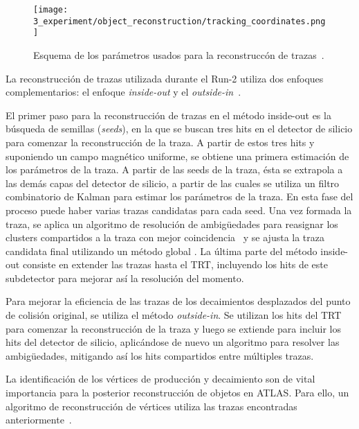 \begin{figure}[ht!]
    \centering
    \texttt{[image: 3\_experiment/object\_reconstruction/tracking\_coordinates.png]}
    \caption{Esquema de los par\'ametros usados para la reconstrucc\'on de trazas~\cite{ATLAS-Tracking-2007}.}
    \label{fig:objects:track_vtx:track_parameters}
\end{figure}

La reconstrucción de trazas utilizada durante el Run-2 utiliza dos enfoques complementarios: el enfoque \textit{inside-out} y el \textit{outside-in}~\cite{ATLAS-NEWT}.

El primer paso para la reconstrucción de trazas en el m\'etodo inside-out es la búsqueda de semillas (\textit{seeds}), en la que se buscan tres hits en el detector de silicio para comenzar la reconstrucción de la traza. A partir de estos tres hits y suponiendo un campo magnético uniforme, se obtiene una primera estimación de los parámetros de la traza. A partir de las seeds de la traza, ésta se extrapola a las demás capas del detector de silicio, a partir de las cuales se utiliza un filtro combinatorio de Kalman para estimar los parámetros de la traza. En esta fase del proceso puede haber varias trazas candidatas para cada seed. Una vez formada la traza, se aplica un algoritmo de resolución de ambigüedades para reasignar los clusters compartidos a la traza con mejor coincidencia~\cite{ATLAS-NNClustering} y se ajusta la traza candidata final utilizando un método global \chisq. La última parte del método inside-out consiste en extender las trazas hasta el \ac{TRT}, incluyendo los hits de este subdetector para mejorar as\'i la resolución del momento.

Para mejorar la eficiencia de las trazas de los decaimientos desplazados del punto de colisión original, se utiliza el m\'etodo \textit{outside-in}. Se utilizan los hits del \ac{TRT} para comenzar la reconstrucci\'on de la traza y luego se extiende para incluir los hits del detector de silicio, aplicándose de nuevo un algoritmo para resolver las ambigüedades, mitigando as\'i los hits compartidos entre m\'ultiples trazas.

La identificaci\'on de los v\'ertices de producci\'on y decaimiento son de vital importancia para la posterior reconstrucci\'on de objetos en \ac{ATLAS}.
Para ello, un algoritmo de reconstrucci\'on de v\'ertices utiliza las trazas encontradas anteriormente~\cite{ATLAS-PVReconstruction,ATLAS-VertexReconstruction}.


